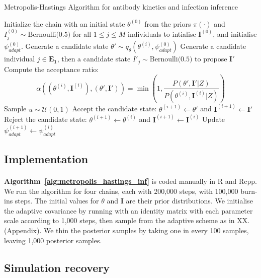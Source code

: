 \documentclass{article}
\begin{document}
\begin{algorithm}[H]
\caption{Metropolis-Hastings Algorithm for antibody kinetics and infection inference}
\label{alg:metropolis_hastings_inf}
\begin{algorithmic}[1]
    \State Initialize the chain with an initial state $\theta^{(0)}$ from the priors $\pi(\cdot)$ and $I^{(0)}_{j} \sim \text{Bernoulli(0.5)}$ for all $1 \leq j \leq M$ individuals to intialise $\mathbf{I}^{(0)}$, and initialise $\psi^{(0)}_{adapt}$.
        \State Generate a candidate state $\theta' \sim q_\theta\left(\theta^{(i)}, \psi^{(0)}_{adapt}\right)$
        \State Generate a candidate individual $j \in \mathbf{E_1} $, then a candidate state $I'_j \sim \text{Bernoulli(0.5)}$ to propose $\mathbf{I}'$
        \State Compute the acceptance ratio:
        \[
        \alpha((\theta^{(i)}, \mathbf{I}^{(i)}),( \theta',  \mathbf{I}')) = \min\left(1, \frac{P(\theta', \mathbf{I}'|Z)}{P(\theta^{(i)}, \mathbf{I}^{(i)}|Z)} \right)
        \]
        \State Sample $u \sim \mathcal{U}(0, 1)$
            \State Accept the candidate state: $\theta^{(i+1)} \leftarrow \theta'$ and $\mathbf{I}^{(i + 1)}  \leftarrow \mathbf{I}'$
        \Else
            \State Reject the candidate state: $\theta^{(i+1)} \leftarrow \theta^{(i)}$ and $\mathbf{I}^{(i + 1)}  \leftarrow \mathbf{I}^{(i)} $
        \EndIf 
        \State Update $ \psi^{(i + 1)}_{adapt} \leftarrow \psi^{(i)}_{adapt}$
    \EndFor
\end{algorithmic} 
\end{algorithm}


\subsection{Implementation }
\paragraph{}  \textbf{Algorithm~\ref{alg:metropolis_hastings_inf}} is coded manually in R and Rcpp. We run the algorithm for four chains, each with 200,000 steps, with 100,000 burn-ins steps. The initial values for $\theta$ and $\mathbf{I}$ are their prior distributions. We initialise the adaptive covariance by running with an identity matrix with each parameter scale according to 1,000 steps, then sample from the adaptive scheme as in XX. (Appendix). We thin the posterior samples by taking one in every 100 samples, leaving 1,000 posterior samples.

\subsection{Simulation recovery }
\end{document}
